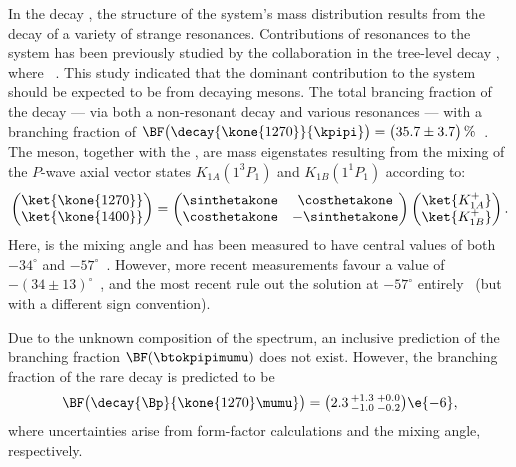 In the decay \btokpipimumu, the structure of the \kpipi system's mass distribution results from the
decay of a variety of strange resonances.
Contributions of resonances to the \kpipi system has been previously studied by the \belle
collaboration in the tree-level decay \btojpsikpipi, where \jpsitomumu~\cite{Guler:2010if}.
This study indicated that the dominant contribution to the \kpipi system should be expected
to be from decaying  mesons.
The total brancing fraction of the decay 
--- via both a non-resonant decay and various resonances ---
with a branching fraction of
$\BF\big(\decay{\kone{1270}}{\kpipi}\big)=\big(35.7\pm3.7\big)\,\%$~\cite{PDG2012}.
The  meson, together with the , are mass eigenstates resulting from the
mixing of the $P$-wave axial vector states $K_{1A}(1^3P_1)$ and $K_{1B}(1^1P_1)$ according to:
\begin{equation}
  \begin{pmatrix}
    \ket{\kone{1270}} \\
    \ket{\kone{1400}}
  \end{pmatrix}
  =
  \begin{pmatrix}
    \sinthetakone & \costhetakone \\
    \costhetakone & -\sinthetakone
  \end{pmatrix}
  \begin{pmatrix}
    \ket{K_{1A}^+} \\
    \ket{K_{1B}^+}
  \end{pmatrix}.
  \label{eq:k1mixing}
\end{equation}
Here, \thetakone is the mixing angle and has been measured to have central values of both $-34^\circ$ and
$-57^\circ$~\cite{PhysRevD.47.1252,Tayduganov:2011ui,Hatanaka:2008xj,Cheng:2011pb,Divotgey:2013jba,Cheng:2013cwa}.
However, more recent measurements favour a value of
$-(34\pm13)^\circ$~\cite{Hatanaka:2008xj,Cheng:2011pb,Divotgey:2013jba,Cheng:2013cwa},
and the most recent rule out the solution at $-57^\circ$ entirely~\cite{Divotgey:2013jba,Cheng:2013cwa}
(but with a different sign convention).

Due to the unknown composition of the \mass{\kpipi} spectrum, an inclusive prediction of the
branching fraction $\BF(\btokpipimumu)$ does not exist.
However, the branching fraction of the rare decay  is predicted to
be~\cite{Hatanaka:2008gu}
\begin{equation}
  \BF\big(\decay{\Bp}{\kone{1270}\mumu}\big) = \big(2.3\,^{+1.3}_{-1.0}\,^{+0.0}_{-0.2}\big)\e{-6},
\end{equation}
where uncertainties arise from form-factor calculations and the mixing angle, respectively.

